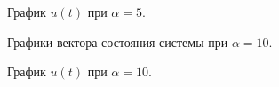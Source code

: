 \begin{figure}[!h]
	\caption{График $u(t)$ при $\alpha = 5$.}
	\label{4_2_u_5}
\end{figure}



\begin{figure}[!h]
	\caption{Графики вектора состояния системы при $\alpha = 10$.}
	\label{4_2_x_10}
\end{figure}

\begin{figure}[!h]
	\caption{График $u(t)$ при $\alpha = 10$.}
	\label{4_2_u_10}
\end{figure}


